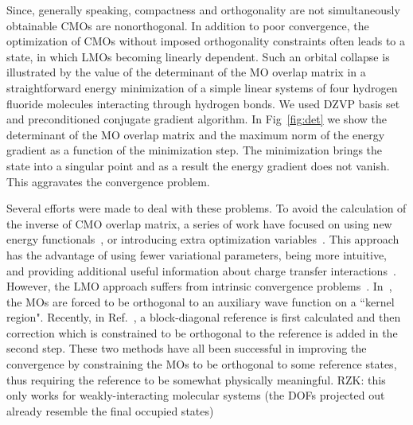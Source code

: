 \documentclass[aps,prl,twocolumn,reprint,amsmath,amssymb]{revtex4-1}
\begin{document}
Since, generally speaking, compactness and orthogonality are not simultaneously obtainable CMOs are nonorthogonal. 
In addition to poor convergence, the optimization of CMOs without imposed orthogonality constraints often leads to a state, in which LMOs becoming linearly dependent. Such an orbital collapse is illustrated by the value of the determinant of the MO overlap matrix in a straightforward energy minimization of a simple linear systems of four hydrogen fluoride molecules interacting through hydrogen bonds. We used DZVP basis set and preconditioned conjugate gradient algorithm. In Fig~\ref{fig:det} we show the determinant of the MO overlap matrix and the maximum norm of the energy gradient as a function of the minimization step. The minimization brings the state into a singular point and as a result the energy gradient does not vanish. This aggravates the convergence problem.




Several efforts were made to deal with these problems. To avoid the calculation of the inverse of CMO overlap matrix, a series of work have focused on using new energy functionals~\cite{mauri1993orbital,kim1995total,ordejon1995linear}, or introducing extra optimization variables~\cite{burger2008linear,peng2013effective}. This approach has the advantage of using fewer variational parameters, being more intuitive, and providing additional useful information about charge transfer interactions~\cite{khaliullin2007unravelling,khaliullin2008analysis}. However, the LMO approach suffers from intrinsic convergence problems~\cite{ordejon1995linear,fattebert2004linear}.
%
In~\cite{tsuchida2007augmented,tsuchida2008ab}, the MOs are forced to be orthogonal to an auxiliary wave function on a ``kernel region". Recently, in Ref.~, a block-diagonal reference is first calculated and then correction which is constrained to be orthogonal to the reference is added in the second step. These two methods have all been successful in improving the convergence by constraining the MOs to be orthogonal to some reference states, thus requiring the reference to be somewhat physically meaningful. RZK: this only works for weakly-interacting molecular systems (the DOFs projected out already resemble the final occupied states)
\end{document}
